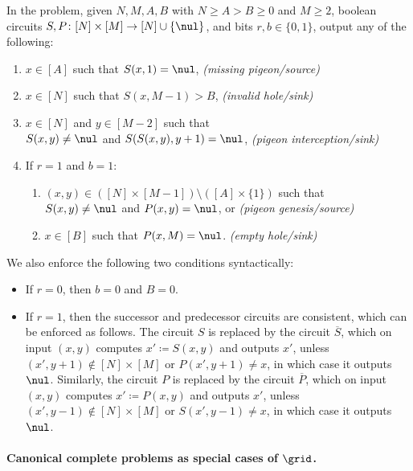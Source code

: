 \begin{definition}\label{definition:grid_problem}
In the \grid problem, given $N,M,A,B$ with $N \geq A > B \geq 0$ and $M \geq 2$, boolean circuits $S, P \colon [N] \times [M] \to [N] \cup \{\nul\}$, and bits $r,b \in \{0,1\}$, output any of the following:
\begin{enumerate}
    \item $x \in [A]$ such that $S(x,1) = \nul$, \hfill \emph{(missing pigeon/source)}
    \item $x \in [N]$ such that $S(x,M-1) > B$, \hfill \emph{(invalid hole/sink)}
    \item $x \in [N]$ and $y \in [M-2]$ such that\\
    $S(x,y) \neq \nul$ and $S(S(x,y),y+1) = \nul$, \hfill \emph{(pigeon interception/sink)}
    \item If $r=1$ and $b=1$:
    \begin{enumerate}
        \item $(x,y) \in ([N] \times [M-1]) \setminus ([A] \times \{1\})$ such that\\
        $S(x,y) \neq \nul$ and $P(x,y) = \nul$, or \hfill \emph{(pigeon genesis/source)}
        \item $x \in [B]$ such that $P(x,M) = \nul$. \hfill \emph{(empty hole/sink)}
    \end{enumerate}
\end{enumerate}
We also enforce the following two conditions syntactically:
\begin{itemize}
    \item If $r=0$, then $b=0$ and $B=0$.
    \item If $r=1$, then the successor and predecessor circuits are consistent, which can be enforced as follows. The circuit $S$ is replaced by the circuit $\overline{S}$, which on input $(x,y)$ computes $x ' \coloneqq S(x,y)$ and outputs $x'$, unless $(x',y+1) \notin [N] \times [M]$ or $P(x',y+1) \neq x$, in which case it outputs $\nul$. Similarly, the circuit $P$ is replaced by the circuit $\overline{P}$, which on input $(x,y)$ computes $x ' \coloneqq P(x,y)$ and outputs $x'$, unless $(x',y-1) \notin [N] \times [M]$ or $S(x',y-1) \neq x$, in which case it outputs $\nul$.
\end{itemize}
\end{definition}


\paragraph{Canonical complete problems as special cases of $\grid$.}

